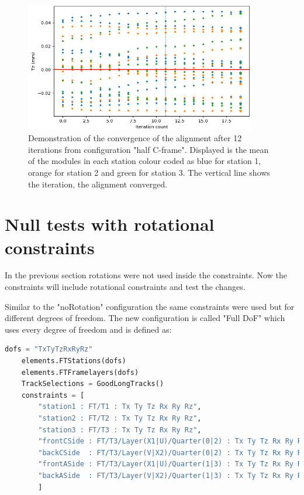 \begin{figure}
  \centering
  \includegraphics[width=0.9\textwidth]{plots/scatter_fig_4_4_convergence.png}
  \caption{Demonstration of the convergence of the alignment after 12 iterations from configuration "half C-frame". Displayed is the mean of the modules in each station colour coded  as blue for station 1, orange for station 2 and green for station 3. The vertical line shows the iteration, the alignment converged.}
  \label{fig:conv}
\end{figure}

\section{Null tests with rotational constraints}
In the previous section rotations were not used inside the constraints. Now the constraints will include rotational constraints and test the changes.

Similar to the "noRotation" configuration the same constraints were used but for different degrees of freedom. The new configuration is called "Full DoF" which uses every degree of freedom and is defined as:

\begin{lstlisting}[language=Python]
    dofs = "TxTyTzRxRyRz"
    elements.FTStations(dofs)
    elements.FTFramelayers(dofs)
    TrackSelections = GoodLongTracks()
    constraints = [
        "station1 : FT/T1 : Tx Ty Tz Rx Ry Rz",
        "station2 : FT/T2 : Tx Ty Tz Rx Ry Rz",
        "station3 : FT/T3 : Tx Ty Tz Rx Ry Rz",
        "frontCSide : FT/T3/Layer(X1|U)/Quarter(0|2) : Tx Ty Tz Rx Ry Rz",
        "backCSide  : FT/T3/Layer(V|X2)/Quarter(0|2) : Tx Ty Tz Rx Ry Rz",
        "frontASide : FT/T3/Layer(X1|U)/Quarter(1|3) : Tx Ty Tz Rx Ry Rz",
        "backASide  : FT/T3/Layer(V|X2)/Quarter(1|3) : Tx Ty Tz Rx Ry Rz"
        ]
\end{lstlisting}

